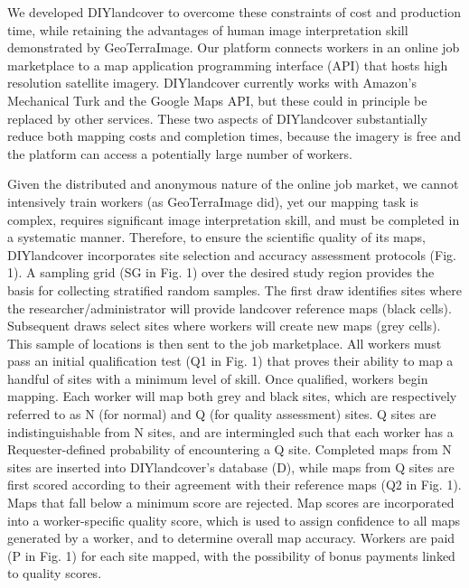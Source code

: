 \documentclass[preprint,12pt,authoryear]{elsarticle}
\begin{document}
We developed DIYlandcover to overcome these constraints of cost and production time, while retaining the advantages of human image interpretation skill demonstrated by GeoTerraImage. Our platform connects workers in an online job marketplace to a map application programming interface (API) that hosts high resolution satellite imagery. DIYlandcover currently works with Amazon's Mechanical Turk \citep{amazon_web_services_amazon_2012} and the Google Maps API, but these could in principle be replaced by other services. These two aspects of DIYlandcover substantially reduce both mapping costs and completion times, because the imagery is free and the platform can access a potentially large number of workers. 

Given the distributed and anonymous nature of the online job market, we cannot intensively train workers (as GeoTerraImage did), yet our mapping task is complex, requires significant image interpretation skill, and must be completed in a systematic manner. Therefore, to ensure the scientific quality of its maps, DIYlandcover incorporates site selection and accuracy assessment protocols (Fig. 1). A sampling grid (SG in Fig. 1) over the desired study region provides the basis for collecting stratified random samples. The first draw identifies sites where the researcher/administrator \citep[the ``Requester'';][]{allahbakhsh_quality_2013} will provide landcover reference maps (black cells). Subsequent draws select sites where workers will create new maps (grey cells). This sample of locations is then sent to the job marketplace. All workers must pass an initial qualification test (Q1 in Fig. 1) that proves their ability to map a handful of sites with a minimum level of skill. Once qualified, workers begin mapping. Each worker will map both grey and black sites, which are respectively referred to as N (for normal) and Q (for quality assessment) sites. Q sites are indistinguishable from N sites, and are intermingled such that each worker has a Requester-defined probability of encountering a Q site. Completed maps from N sites are inserted into DIYlandcover's database (D), while maps from Q sites are first scored according to their agreement with their reference maps (Q2 in Fig. 1). Maps that fall below a minimum score are rejected. Map scores are incorporated into a worker-specific quality score, which is used to assign confidence to all maps generated by a worker, and to determine overall map accuracy. Workers are paid (P in Fig. 1) for each site mapped, with the possibility of bonus payments linked to quality scores.    
\end{document}
